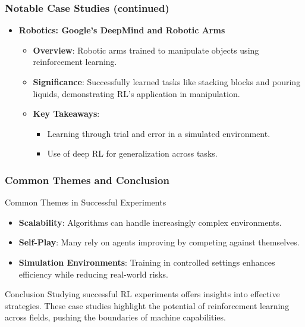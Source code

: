 \documentclass[aspectratio=169]{beamer}
\begin{document}
\begin{frame}[fragile]
    \frametitle{Notable Case Studies (continued)}
    \begin{itemize}
        \item \textbf{Robotics: Google's DeepMind and Robotic Arms}
        \begin{itemize}
            \item \textbf{Overview}: Robotic arms trained to manipulate objects using reinforcement learning.
            \item \textbf{Significance}: Successfully learned tasks like stacking blocks and pouring liquids, demonstrating RL's application in manipulation.
            \item \textbf{Key Takeaways}:
            \begin{itemize}
                \item Learning through trial and error in a simulated environment.
                \item Use of deep RL for generalization across tasks.
            \end{itemize}
        \end{itemize}
    \end{itemize}
\end{frame}

\begin{frame}[fragile]
    \frametitle{Common Themes and Conclusion}
    \begin{block}{Common Themes in Successful Experiments}
        \begin{itemize}
            \item \textbf{Scalability}: Algorithms can handle increasingly complex environments.
            \item \textbf{Self-Play}: Many rely on agents improving by competing against themselves.
            \item \textbf{Simulation Environments}: Training in controlled settings enhances efficiency while reducing real-world risks.
        \end{itemize}
    \end{block}

    \begin{block}{Conclusion}
        Studying successful RL experiments offers insights into effective strategies. These case studies highlight the potential of reinforcement learning across fields, pushing the boundaries of machine capabilities.
    \end{block}
\end{frame}
\end{document}
